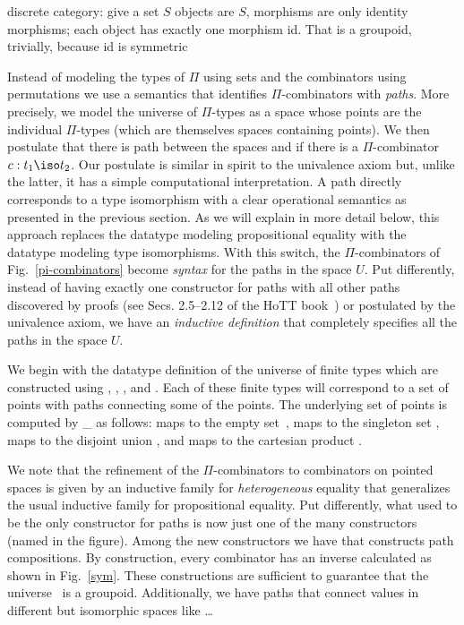 discrete category: give a set $S$ objects are $S$, morphisms are only
identity morphisms; each object has exactly one morphism id. That is a
groupoid, trivially, because id is symmetric

Instead of modeling the types of $\Pi$ using sets and the combinators using
permutations we use a semantics that identifies $\Pi$-combinators with
\emph{paths}. More precisely, we model the universe of $\Pi$-types as a space
 whose points are the individual $\Pi$-types (which are
themselves spaces  containing points). We then postulate that
there is path between the spaces  and  if there
is a $\Pi$-combinator $c : t_1 \iso t_2$. Our postulate is similar in spirit
to the univalence axiom but, unlike the latter, it has a simple computational
interpretation. A path directly corresponds to a type isomorphism with a
clear operational semantics as presented in the previous section. As we will
explain in more detail below, this approach replaces the datatype
 modeling propositional equality with the datatype
 modeling type isomorphisms. With this switch, the
$\Pi$-combinators of Fig.~\ref{pi-combinators} become \emph{syntax} for the
paths in the space $U$. Put differently, instead of having exactly one
constructor  for paths with all other paths
discovered by proofs (see Secs. 2.5--2.12 of the HoTT
book~\citeyearpar{hottbook}) or postulated by the univalence axiom, we have
an \emph{inductive definition} that completely specifies all the paths in the
space $U$.

We begin with the datatype definition of the universe  of finite
types which are constructed using ,
, , and
. Each of these finite types will correspond
to a set of points with paths connecting some of the points. The underlying
set of points is computed by \_ as follows:
 maps to the empty set~,
 maps to the singleton set ,
 maps to the disjoint union ,
and  maps to the cartesian product
.

We note that the refinement of the $\Pi$-combinators to combinators on
pointed spaces is given by an inductive family for
\emph{heterogeneous} equality that generalizes the usual inductive
family for propositional equality. Put differently, what used to be
the only constructor for paths  is now
just one of the many constructors (named
 in the figure). Among the new
constructors we have  that constructs path
compositions. By construction, every combinator has an inverse
calculated as shown in Fig.~\ref{sym}. These constructions are
sufficient to guarantee that the universe~ is a
groupoid. Additionally, we have paths that connect values in different
but isomorphic spaces like \ldots

